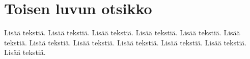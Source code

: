 \chapter{Toisen luvun otsikko}
\label{Toinen luku}

Lisää tekstiä. Lisää tekstiä. Lisää tekstiä. Lisää tekstiä. Lisää tekstiä. Lisää tekstiä. Lisää tekstiä. Lisää tekstiä. Lisää tekstiä. Lisää tekstiä. Lisää tekstiä. Lisää tekstiä.